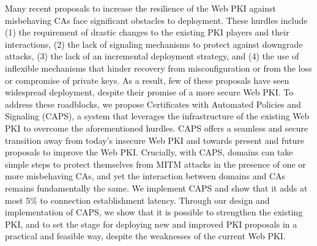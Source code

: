 Many recent proposals to increase the resilience of the Web PKI against
misbehaving CAs face significant obstacles to deployment. These hurdles include
(1) the requirement of drastic changes to the existing PKI players and their
interactions, (2) the lack of signaling mechanisms to protect against
downgrade attacks, (3) the lack of an incremental deployment strategy, and (4)
the use of inflexible mechanisms that hinder recovery from misconfiguration or
from the loss or compromise of private keys.  As a result, few of these
proposals have seen widespread deployment, despite their promise of a more
secure Web PKI.  To address these roadblocks, we propose Certificates with
Automated Policies and Signaling (CAPS), a system that leverages the
infrastructure of the existing Web PKI to overcome the aforementioned hurdles.
CAPS offers a seamless and secure transition away from today's insecure Web PKI
and towards present and future proposals to improve the Web PKI.  Crucially,
with CAPS, domains can take simple steps to protect themselves from MITM
attacks in the presence of one or more misbehaving CAs, and yet the interaction
between domains and CAs remains fundamentally the same.  We implement CAPS and
show that it adds at most 5\% to connection establishment latency.  Through our
design and implementation of CAPS, we show that it is possible to strengthen
the existing PKI, and to set the stage for deploying new and improved PKI
proposals in a practical and feasible way, despite the weaknesses of the
current Web PKI.
